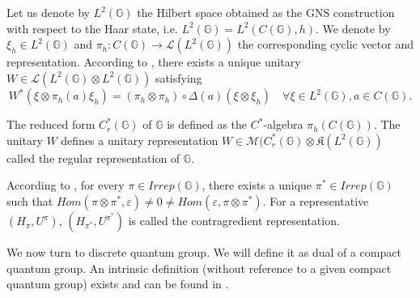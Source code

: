Let us denote by $L^2(\mathbb G)$ the Hilbert space obtained as the GNS construction with respect to the Haar state, i.e. $L^2(\mathbb G) = L^2(C(\mathbb G),h)$. We denote by $\xi_h\in L^2(\mathbb G)$ and $\pi_h : C(\mathbb G)\rightarrow \mathcal L(L^2(\mathbb G))$ the corresponding cyclic vector and representation. According to \cite{Wo}, there exists a unique unitary $W\in \mathcal L(L^2(\mathbb G) \otimes L^2(\mathbb G) )$ satisfying 
\[W^*(\xi\otimes \pi_h(a)\xi_h ) = (\pi_h\otimes\pi_h)\circ \Delta(a)(\xi\otimes \xi_h)\quad \forall \xi\in L^2(\mathbb G),a\in C(\mathbb G).\] 

\begin{definition}
The reduced form $C_r^*(\mathbb G)$ of $\mathbb G$ is defined as the $C^*$-algebra $\pi_h(C(\mathbb G))$. The unitary $W$ defines a unitary representation $W\in\mathcal M(C_r^*(\mathbb G)\otimes \mathfrak K(L^2(\mathbb G))$ called the regular representation of $\mathbb G$.
\end{definition}

According to \cite{Wo}, for every $\pi\in Irrep(\mathbb G)$, there exists a unique $\pi^*\in Irrep(\mathbb G)$ such that $Hom(\pi\otimes \pi^*,\varepsilon)\neq 0 \neq Hom(\varepsilon,\pi\otimes \pi^*) $. For a representative $(H_\pi,U^\pi)$, $(H_{\pi^*},U^{\pi^*})$ is called the contragredient representation. %

We now turn to discrete quantum group. We will define it as dual of a compact quantum group. An intrinsic definition (without reference to a given compact quantum group) exists and can be found in \cite{vandaele}.\\

